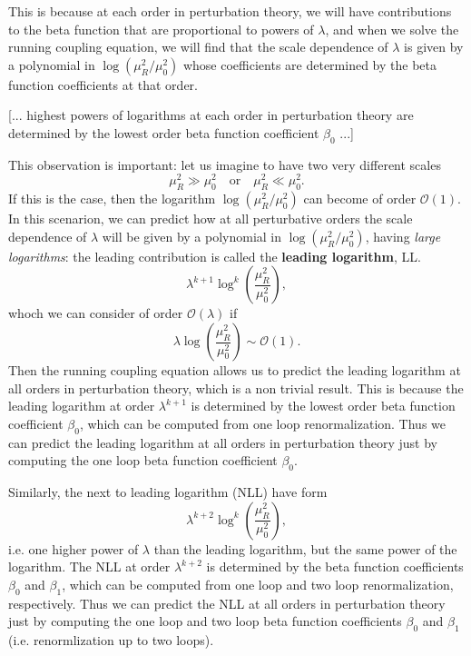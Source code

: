 This is because at each order in perturbation theory, we will have contributions to the beta function that are proportional to powers of \(\lambda\), and when we solve the running coupling equation, we will find that the scale dependence of \(\lambda\) is given by a polynomial in \(\log(\mu_R^2/\mu_0^2)\) whose coefficients are determined by the beta function coefficients at that order.

    [... highest powers of logarithms at each order in perturbation theory are determined by the lowest order beta function coefficient \(\beta_0\) ...]

This observation is important: let us imagine to have two very different scales
\[
    \mu_R^2 \gg \mu_0^2 \quad \text{or} \quad \mu_R^2 \ll \mu_0^2.
\]
If this is the case, then the logarithm \(\log(\mu_R^2/\mu_0^2)\) can become of order \(\mathcal{O}(1)\). In this scenarion, we can predict how at all perturbative orders the scale dependence of \(\lambda\) will be given by a polynomial in \(\log(\mu_R^2/\mu_0^2)\), having \textit{large logarithms}: the leading contribution is called the \textbf{leading logarithm}, LL.
\[
    \lambda^{k+1} \log^k(\frac{\mu_R^2}{\mu_0^2}),
\]
whoch we can consider of order \(\mathcal{O}(\lambda)\) if
\[
    \lambda \log(\frac{\mu_R^2}{\mu_0^2}) \sim \mathcal{O}(1).
\]
Then the running coupling equation allows us to predict the leading logarithm at all orders in perturbation theory, which is a non trivial result. This is because the leading logarithm at order \(\lambda^{k+1}\) is determined by the lowest order beta function coefficient \(\beta_0\), which can be computed from one loop renormalization. Thus we can predict the leading logarithm at all orders in perturbation theory just by computing the one loop beta function coefficient \(\beta_0\).

Similarly, the next to leading logarithm (NLL) have form
\[
    \lambda^{k+2} \log^k(\frac{\mu_R^2}{\mu_0^2}),
\]
i.e. one higher power of \(\lambda\) than the leading logarithm, but the same power of the logarithm. The NLL at order \(\lambda^{k+2}\) is determined by the beta function coefficients \(\beta_0\) and \(\beta_1\), which can be computed from one loop and two loop renormalization, respectively. Thus we can predict the NLL at all orders in perturbation theory just by computing the one loop and two loop beta function coefficients \(\beta_0\) and \(\beta_1\) (i.e. renormlization up to two loops).

